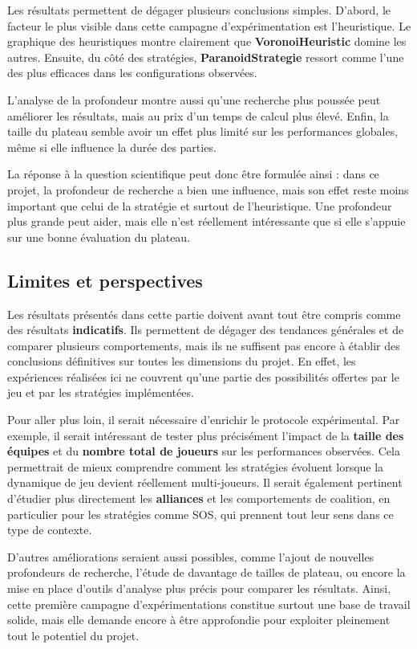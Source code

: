 \documentclass[11pt,a4paper]{article}
\begin{document}
Les résultats permettent de dégager plusieurs conclusions simples. D’abord, le facteur le plus visible dans cette campagne d’expérimentation est l’heuristique. Le graphique des heuristiques montre clairement que \textbf{VoronoiHeuristic} domine les autres. Ensuite, du côté des stratégies, \textbf{ParanoidStrategie} ressort comme l’une des plus efficaces dans les configurations observées.

L’analyse de la profondeur montre aussi qu’une recherche plus poussée peut améliorer les résultats, mais au prix d’un temps de calcul plus élevé. Enfin, la taille du plateau semble avoir un effet plus limité sur les performances globales, même si elle influence la durée des parties.

La réponse à la question scientifique peut donc être formulée ainsi : dans ce projet, la profondeur de recherche a bien une influence, mais son effet reste moins important que celui de la stratégie et surtout de l’heuristique. Une profondeur plus grande peut aider, mais elle n’est réellement intéressante que si elle s’appuie sur une bonne évaluation du plateau.
\subsection{Limites et perspectives}

Les résultats présentés dans cette partie doivent avant tout être compris comme des résultats \textbf{indicatifs}. Ils permettent de dégager des tendances générales et de comparer plusieurs comportements, mais ils ne suffisent pas encore à établir des conclusions définitives sur toutes les dimensions du projet. En effet, les expériences réalisées ici ne couvrent qu’une partie des possibilités offertes par le jeu et par les stratégies implémentées.

Pour aller plus loin, il serait nécessaire d’enrichir le protocole expérimental. Par exemple, il serait intéressant de tester plus précisément l’impact de la \textbf{taille des équipes} et du \textbf{nombre total de joueurs} sur les performances observées. Cela permettrait de mieux comprendre comment les stratégies évoluent lorsque la dynamique de jeu devient réellement multi-joueurs. Il serait également pertinent d’étudier plus directement les \textbf{alliances} et les comportements de coalition, en particulier pour les stratégies comme SOS, qui prennent tout leur sens dans ce type de contexte.

D’autres améliorations seraient aussi possibles, comme l’ajout de nouvelles profondeurs de recherche, l’étude de davantage de tailles de plateau, ou encore la mise en place d’outils d’analyse plus précis pour comparer les résultats. Ainsi, cette première campagne d’expérimentations constitue surtout une base de travail solide, mais elle demande encore à être approfondie pour exploiter pleinement tout le potentiel du projet.
\end{document}
